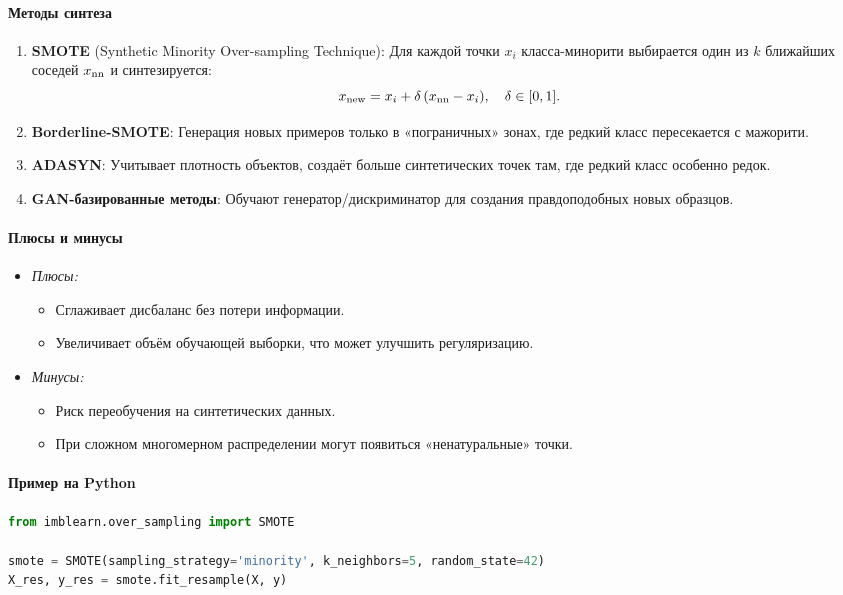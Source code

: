 \paragraph{Методы синтеза}
\begin{enumerate}
  \item \textbf{SMOTE} (Synthetic Minority Over-sampling Technique):  
    Для каждой точки \(x_i\) класса-минорити выбирается один из \(k\) ближайших соседей \(x_{\rm nn}\) и синтезируется:
    \[
      x_{\rm new} = x_i + \delta\,(x_{\rm nn} - x_i),\quad \delta\in[0,1].
    \]
  \item \textbf{Borderline-SMOTE}:  
    Генерация новых примеров только в «пограничных» зонах, где редкий класс пересекается с мажорити.
  \item \textbf{ADASYN}:  
    Учитывает плотность объектов, создаёт больше синтетических точек там, где редкий класс особенно редок.
  \item \textbf{GAN-базированные методы}:  
    Обучают генератор/дискриминатор для создания правдоподобных новых образцов.
\end{enumerate}

\paragraph{Плюсы и минусы}
\begin{itemize}
  \item \emph{Плюсы:}  
    \begin{itemize}
      \item Сглаживает дисбаланс без потери информации.  
      \item Увеличивает объём обучающей выборки, что может улучшить регуляризацию.
    \end{itemize}
  \item \emph{Минусы:}  
    \begin{itemize}
      \item Риск переобучения на синтетических данных.  
      \item При сложном многомерном распределении могут появиться «ненатуральные» точки.
    \end{itemize}
\end{itemize}

\paragraph{Пример на Python}
\begin{lstlisting}[language=Python]
from imblearn.over_sampling import SMOTE

smote = SMOTE(sampling_strategy='minority', k_neighbors=5, random_state=42)
X_res, y_res = smote.fit_resample(X, y)
\end{lstlisting}

